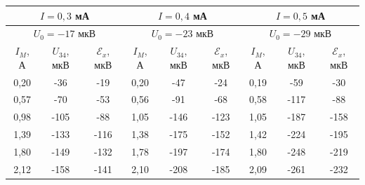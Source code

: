 \documentclass[a4paper, 12pt]{article}
\begin{document}
    \begin{table}[H]
        \centering
        \begin{tabular}{ccccccccc}
        \hline
        \multicolumn{3}{|c|}{$I = 0,3$ мА} & \multicolumn{3}{c|}{$I = 0,4$ мА} & \multicolumn{3}{c|}{$I = 0,5$ мА} \\ \hline
        \multicolumn{3}{|c|}{$U_0 = -17$ мкВ} & \multicolumn{3}{c|}{$U_0 = -23$ мкВ} & \multicolumn{3}{c|}{$U_0 = -29$ мкВ} \\ \hline
        \multicolumn{1}{|c|}{$I_M$, А} & \multicolumn{1}{c|}{$U_{34}$, мкВ} & \multicolumn{1}{c|}{$\mathcal{E}_x$, мкВ} & \multicolumn{1}{c|}{$I_M$, А} & \multicolumn{1}{c|}{$U_{34}$, мкВ} & \multicolumn{1}{c|}{$\mathcal{E}_x$, мкВ} & \multicolumn{1}{c|}{$I_M$, А} & \multicolumn{1}{c|}{$U_{34}$, мкВ} & \multicolumn{1}{c|}{$\mathcal{E}_x$, мкВ} \\ \hline
        \multicolumn{1}{|c|}{0,20} & \multicolumn{1}{c|}{-36} & \multicolumn{1}{c|}{-19} & \multicolumn{1}{c|}{0,20} & \multicolumn{1}{c|}{-47} & \multicolumn{1}{c|}{-24} & \multicolumn{1}{c|}{0,19} & \multicolumn{1}{c|}{-59} & \multicolumn{1}{c|}{-30} \\ \hline
        \multicolumn{1}{|c|}{0,57} & \multicolumn{1}{c|}{-70} & \multicolumn{1}{c|}{-53} & \multicolumn{1}{c|}{0,56} & \multicolumn{1}{c|}{-91} & \multicolumn{1}{c|}{-68} & \multicolumn{1}{c|}{0,58} & \multicolumn{1}{c|}{-117} & \multicolumn{1}{c|}{-88} \\ \hline
        \multicolumn{1}{|c|}{0,98} & \multicolumn{1}{c|}{-105} & \multicolumn{1}{c|}{-88} & \multicolumn{1}{c|}{1,05} & \multicolumn{1}{c|}{-146} & \multicolumn{1}{c|}{-123} & \multicolumn{1}{c|}{1,05} & \multicolumn{1}{c|}{-187} & \multicolumn{1}{c|}{-158} \\ \hline
        \multicolumn{1}{|c|}{1,39} & \multicolumn{1}{c|}{-133} & \multicolumn{1}{c|}{-116} & \multicolumn{1}{c|}{1,38} & \multicolumn{1}{c|}{-175} & \multicolumn{1}{c|}{-152} & \multicolumn{1}{c|}{1,42} & \multicolumn{1}{c|}{-224} & \multicolumn{1}{c|}{-195} \\ \hline
        \multicolumn{1}{|c|}{1,80} & \multicolumn{1}{c|}{-149} & \multicolumn{1}{c|}{-132} & \multicolumn{1}{c|}{1,78} & \multicolumn{1}{c|}{-197} & \multicolumn{1}{c|}{-174} & \multicolumn{1}{c|}{1,80} & \multicolumn{1}{c|}{-248} & \multicolumn{1}{c|}{-219} \\ \hline
        \multicolumn{1}{|c|}{2,12} & \multicolumn{1}{c|}{-158} & \multicolumn{1}{c|}{-141} & \multicolumn{1}{c|}{2,10} & \multicolumn{1}{c|}{-208} & \multicolumn{1}{c|}{-185} & \multicolumn{1}{c|}{2,09} & \multicolumn{1}{c|}{-261} & \multicolumn{1}{c|}{-232} \\ \hline

\end{tabular}
\end{table}
\end{document}
